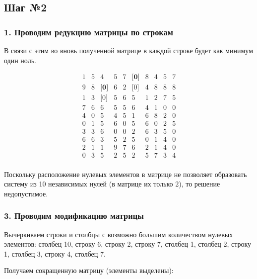 \documentclass[17pt]{extarticle}
\begin{document}
\subsection*{Шаг №2}

\subsubsection*{1. Проводим редукцию матрицы по строкам}

В связи с этим во вновь полученной матрице в каждой строке будет как минимум один ноль.

\[
    \begin{array}{*{10}{c}}
        1 & 5 & 4            & 5 & 7 & \textbf{[0]} & 8 & 4 & 5 & 7 \\
        9 & 8 & \textbf{[0]} & 6 & 2 & \text{[0]}   & 4 & 8 & 8 & 8 \\
        1 & 3 & \text{[0]}   & 5 & 6 & 5            & 1 & 2 & 7 & 5 \\
        7 & 6 & 6            & 5 & 5 & 6            & 4 & 1 & 0 & 0 \\
        4 & 0 & 5            & 4 & 5 & 1            & 6 & 8 & 2 & 0 \\
        0 & 1 & 5            & 6 & 0 & 5            & 6 & 0 & 2 & 5 \\
        3 & 3 & 6            & 0 & 0 & 2            & 6 & 3 & 5 & 0 \\
        6 & 6 & 3            & 5 & 2 & 5            & 0 & 1 & 4 & 0 \\
        2 & 1 & 1            & 9 & 7 & 6            & 2 & 1 & 4 & 0 \\
        0 & 3 & 5            & 2 & 5 & 2            & 5 & 7 & 3 & 4 \\
    \end{array}
\]

Поскольку расположение нулевых элементов в матрице не позволяет образовать систему из 10 независимых нулей (в матрице их только 2), то решение недопустимое.

\subsubsection*{3. Проводим модификацию матрицы}

Вычеркиваем строки и столбцы с возможно большим количеством нулевых элементов: столбец 10, строку 6, строку 2, строку 7, столбец 1, столбец 2, строку 1, столбец 3, строку 4, столбец 7.

Получаем сокращенную матрицу (элементы выделены):
\end{document}
